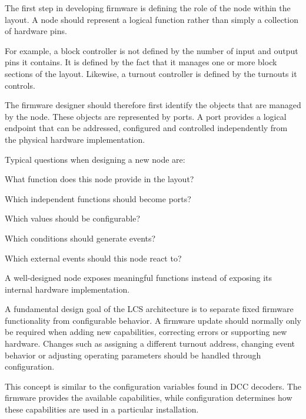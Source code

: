 The first step in developing firmware is defining the role of the node within
the layout. A node should represent a logical function rather than simply a
collection of hardware pins.

For example, a block controller is not defined by the number of input and output
pins it contains. It is defined by the fact that it manages one or more block
sections of the layout. Likewise, a turnout controller is defined by the
turnouts it controls.

The firmware designer should therefore first identify the objects that are
managed by the node. These objects are represented by ports. A port provides a
logical endpoint that can be addressed, configured and controlled independently
from the physical hardware implementation.

Typical questions when designing a new node are:

\begin{smallGapItemize}
    \item What function does this node provide in the layout?
    \item Which independent functions should become ports?
    \item Which values should be configurable?
    \item Which conditions should generate events?
    \item Which external events should this node react to?
\end{smallGapItemize}

A well-designed node exposes meaningful functions instead of exposing its
internal hardware implementation.


A fundamental design goal of the LCS architecture is to separate fixed firmware
functionality from configurable behavior.
A firmware update should normally only be required when adding new capabilities,
correcting errors or supporting new hardware. Changes such as assigning a
different turnout address, changing event behavior or adjusting operating
parameters should be handled through configuration.

This concept is similar to the configuration variables found in DCC decoders.
The firmware provides the available capabilities, while configuration determines
how these capabilities are used in a particular installation.

